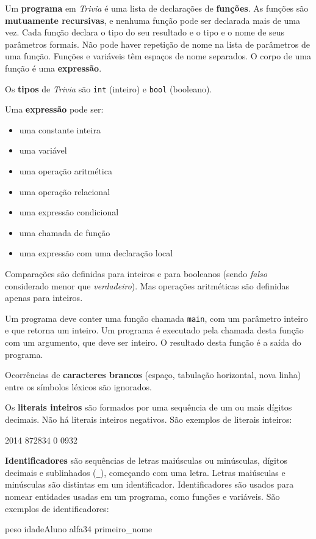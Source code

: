 \documentclass[a4paper,11pt,brazil]{article}
\newcommand{\lang}{\textsl{Trivia}}
\begin{document}
Um \textbf{programa} em \lang{} é uma lista de declarações de
\textbf{funções}. As funções são \textbf{mutuamente recursivas}, e
nenhuma função pode ser declarada mais de uma vez. Cada função declara
o tipo do seu resultado e o tipo e o nome de seus parâmetros
formais. Não pode haver repetição de nome na lista de parâmetros de
uma função. Funções e variáveis têm espaços de nome separados. O corpo
de uma função é uma \textbf{expressão}.

Os \textbf{tipos} de \lang{} são \texttt{int} (inteiro) e
\texttt{bool} (booleano).

Uma \textbf{expressão} pode ser:
\begin{itemize}[noitemsep]
  \item uma constante inteira
  \item uma variável
  \item uma operação aritmética
  \item uma operação relacional
  \item uma expressão condicional
  \item uma chamada de função
  \item uma expressão com uma declaração local
\end{itemize}

Comparações são definidas para inteiros e para booleanos (sendo
\emph{falso} considerado menor que \emph{verdadeiro}). Mas operações
aritméticas são definidas apenas para inteiros.

Um programa deve conter uma função chamada \texttt{main}, com um
parâmetro inteiro e que retorna um inteiro. Um programa é executado
pela chamada desta função com um argumento, que deve ser inteiro. O
resultado desta função é a saída do programa.

Ocorrências de \textbf{caracteres brancos} (espaço, tabulação
horizontal, nova linha) entre os símbolos léxicos são ignorados.

Os \textbf{literais inteiros} são formados por uma sequência de um ou
mais dígitos decimais. Não há literais inteiros negativos. São
exemplos de literais inteiros:
\begin{pygmented}[lang=text]
2014
872834
0
0932
\end{pygmented}

\textbf{Identificadores} são sequências de letras maiúsculas ou
minúsculas, dígitos decimais e sublinhados (\texttt{\_}), começando
com uma letra. Letras maiúsculas e minúsculas são distintas em um
identificador. Identificadores são usados para nomear entidades usadas
em um programa, como funções e variáveis. São exemplos de
identificadores:
\begin{pygmented}[lang=text]
peso
idadeAluno
alfa34
primeiro_nome
\end{pygmented}
\end{document}

